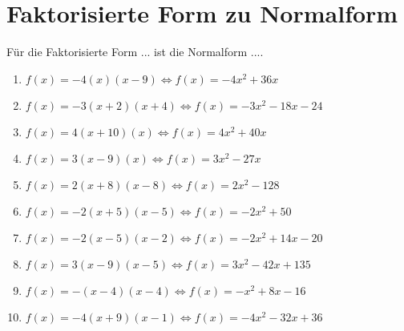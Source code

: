 \documentclass{article}%
\begin{document}
\section{Faktorisierte Form zu Normalform}%
\label{sec:FaktorisierteFormzuNormalform}%
Für die Faktorisierte Form ... ist die Normalform ....%
\begin{enumerate}[label=\alph*)]%
\item%
\newline\vspace{0.5cm}$f(x)=-4(x)(x-9)\Leftrightarrow f(x)=-4x^2 + 36x$%
\item%
\newline\vspace{0.5cm}$f(x)=-3(x+2)(x+4)\Leftrightarrow f(x)=-3x^2 - 18x - 24$%
\item%
\newline\vspace{0.5cm}$f(x)=4(x+10)(x)\Leftrightarrow f(x)=4x^2 + 40x$%
\item%
\newline\vspace{0.5cm}$f(x)=3(x-9)(x)\Leftrightarrow f(x)=3x^2 - 27x$%
\item%
\newline\vspace{0.5cm}$f(x)=2(x+8)(x-8)\Leftrightarrow f(x)=2x^2 - 128$%
\item%
\newline\vspace{0.5cm}$f(x)=-2(x+5)(x-5)\Leftrightarrow f(x)=-2x^2 + 50$%
\item%
\newline\vspace{0.5cm}$f(x)=-2(x-5)(x-2)\Leftrightarrow f(x)=-2x^2 + 14x - 20$%
\item%
\newline\vspace{0.5cm}$f(x)=3(x-9)(x-5)\Leftrightarrow f(x)=3x^2 - 42x + 135$%
\item%
\newline\vspace{0.5cm}$f(x)=-(x-4)(x-4)\Leftrightarrow f(x)=-x^2 + 8x - 16$%
\item%
\newline\vspace{0.5cm}$f(x)=-4(x+9)(x-1)\Leftrightarrow f(x)=-4x^2 - 32x + 36$%
\end{enumerate}

%
\end{document}
